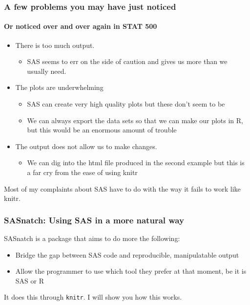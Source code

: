 \documentclass[xcolor=dvipsnames,gray,mathserif]{beamer}
\begin{document}
\begin{frame}
   \frametitle{A few problems you may have just noticed}
   \framesubtitle{Or noticed over and over again in STAT 500}
   \begin{itemize}
      \item There is too much output.
      \begin{itemize}
         \item SAS seems to err on the side of caution and gives us more than we usually need.
      \end{itemize}
      \item The plots are underwhelming
      \begin{itemize}
         \item SAS can create very high quality plots but these don't seem to be
         \item We can always export the data sets so that we can make our plots in R, but this would be an enormous amount of trouble
      \end{itemize}
      \pause
      \item The output does not allow us to make changes.
      \begin{itemize}
         \item We can dig into the html file produced in the second example
            but this is a far cry from the ease of using knitr
      \end{itemize}
   \end{itemize}
   Most of my complaints about SAS have to do with the way it fails to work like knitr.
\end{frame}

\begin{frame}[fragile]
   \frametitle{SASnatch: Using SAS in a more natural way}

   SASnatch is a package that aims to do more the following:
   \begin{itemize}
      \item Bridge the gap between SAS code and reproducible, manipulatable output \\

      \item Allow the programmer to use which tool they prefer at that moment, be
         it is SAS or R
   \end{itemize}

   It does this through \verb!knitr!. I will show you how this works.
\end{frame}
\end{document}
